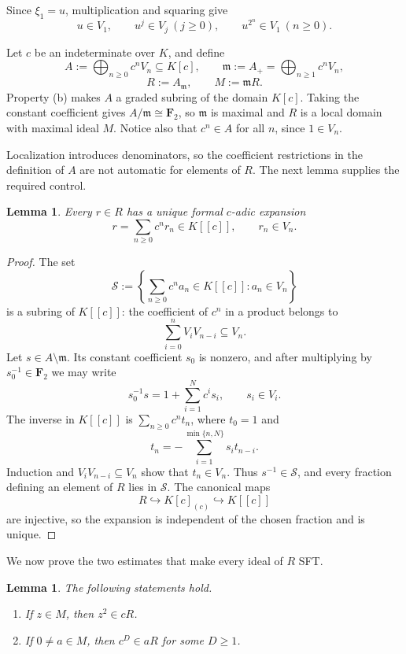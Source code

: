 \documentclass[11pt,reqno]{amsart}
\numberwithin{equation}{section}
\theoremstyle{plain}
\newtheorem{lemma}[theorem]{Lemma}
\theoremstyle{definition}
\theoremstyle{remark}
\newcommand{\F}{\mathbf F}
\newcommand{\fm}{\mathfrak m}
\newcommand{\cS}{\mathcal S}
\begin{document}
Since $\xi_1=u$, multiplication and squaring give
\begin{equation}\label{eq:u-bounds-char2}
  u\in V_1,\qquad u^j\in V_j\ (j\geq0),\qquad
  u^{2^n}\in V_1\ (n\geq0).
\end{equation}

Let $c$ be an indeterminate over $K$, and define
\[
  A:=\bigoplus_{n\geq0}c^nV_n\subseteq K[c],\qquad
  \fm:=A_+=\bigoplus_{n\geq1}c^nV_n,
\]
\begin{equation}\label{eq:R-char2}
  R:=A_{\fm},\qquad M:=\fm R.
\end{equation}
Property (b) makes $A$ a graded subring of the domain $K[c]$.  Taking the
constant coefficient gives $A/\fm\cong\F_2$, so $\fm$ is maximal and $R$
is a local domain with maximal ideal $M$.  Notice also that $c^n\in A$ for
all $n$, since $1\in V_n$.

Localization introduces denominators, so the coefficient restrictions in
the definition of $A$ are not automatic for elements of $R$.  The next
lemma supplies the required control.

\begin{lemma}\label{lem:formal-expansion}
Every $r\in R$ has a unique formal $c$-adic expansion
\begin{equation}\label{eq:formal-expansion}
  r=\sum_{n\geq0}c^nr_n\in K[[c]],\qquad r_n\in V_n.
\end{equation}
\end{lemma}

\begin{proof}
The set
\[
  \cS:=\left\{\sum_{n\geq0}c^na_n\in K[[c]]:a_n\in V_n\right\}
\]
is a subring of $K[[c]]$: the coefficient of $c^n$ in a product belongs to
\[
  \sum_{i=0}^nV_iV_{n-i}\subseteq V_n.
\]
Let $s\in A\setminus\fm$.  Its constant coefficient $s_0$ is nonzero, and
after multiplying by $s_0^{-1}\in\F_2$ we may write
\[
  s_0^{-1}s=1+\sum_{i=1}^Nc^is_i,\qquad s_i\in V_i.
\]
The inverse in $K[[c]]$ is $\sum_{n\geq0}c^nt_n$, where $t_0=1$ and
\[
  t_n=-\sum_{i=1}^{\min\{n,N\}}s_it_{n-i}.
\]
Induction and $V_iV_{n-i}\subseteq V_n$ show that $t_n\in V_n$.  Thus
$s^{-1}\in\cS$, and every fraction defining an element of $R$ lies in
$\cS$.  The canonical maps
\[
  R\hookrightarrow K[c]_{(c)}\hookrightarrow K[[c]]
\]
are injective, so the expansion is independent of the chosen fraction and
is unique.
\end{proof}

We now prove the two estimates that make every ideal of $R$ SFT.

\begin{lemma}\label{lem:two-estimates}
The following statements hold.
\begin{enumerate}[label=\textup{(\alph*)}]
\item If $z\in M$, then $z^2\in cR$.
\item If $0\neq a\in M$, then $c^D\in aR$ for some $D\geq1$.
\end{enumerate}
\end{lemma}
\end{document}
